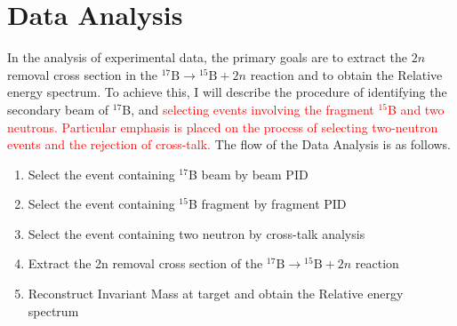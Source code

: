\chapter{Data Analysis}
In the analysis of experimental data, the primary goals are to extract the $2n$ removal cross section in the ${}^{17}\text{B} \to {}^{15}\text{B} + 2n$ reaction and to obtain the Relative energy spectrum. To achieve this, I will describe the procedure of identifying the secondary beam of ${}^{17}$B, and \textcolor{red}{selecting events involving the fragment ${}^{15}$B and two neutrons. Particular emphasis is placed on the process of selecting two-neutron events and the rejection of cross-talk.} The flow of the Data Analysis is as follows.

\begin{center}
    \begin{enumerate}[noitemsep]
        \item Select the event containing ${}^{17}$B beam by beam PID
        \item Select the event containing ${}^{15}$B fragment by fragment PID
        \item Select the event containing two neutron by cross-talk analysis
        \item Extract the 2n removal cross section of the ${}^{17}\text{B} \to {}^{15}\text{B} + 2n$ reaction
        \item Reconstruct Invariant Mass at target and obtain the Relative energy spectrum 
    \end{enumerate}
\end{center}

